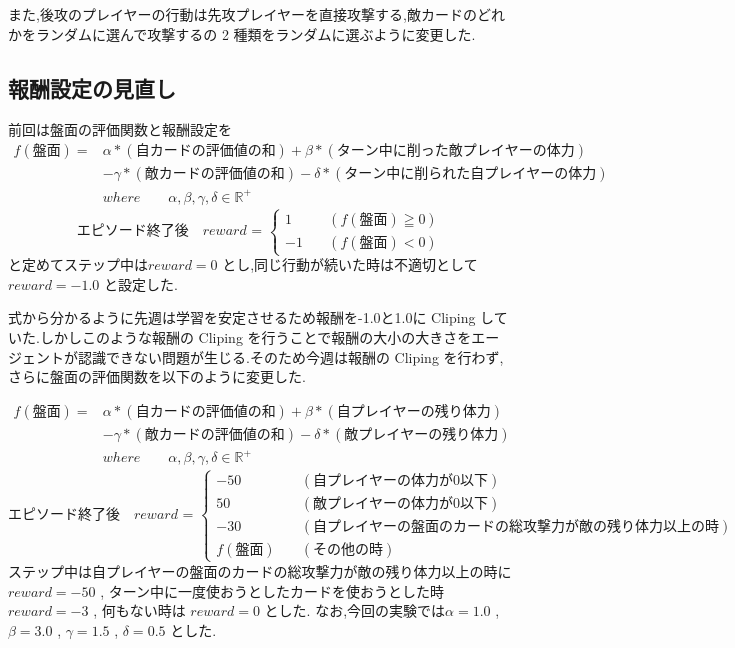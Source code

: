 \documentclass{jarticle}     %
\begin{document}
また,後攻のプレイヤーの行動は先攻プレイヤーを直接攻撃する,敵カードのどれかをランダムに選んで攻撃するの 2 種類をランダムに選ぶように変更した.

\subsection{報酬設定の見直し}
前回は盤面の評価関数と報酬設定を
\begin{equation*}
  \begin{split}
    f(\mathrm{盤面}) = 
    &\alpha*\mathrm{(自カードの評価値の和)}+\beta*\mathrm{(ターン中に削った敵プレイヤーの体力)}\\
   & - \gamma*\mathrm{(敵カードの評価値の和)} - \delta*\mathrm{(ターン中に削られた自プレイヤーの体力)}\\
    &where \qquad \alpha , \beta , \gamma , \delta \in \mathbb{R}^+
  \end{split}
\end{equation*}
\begin{equation*}
  \mathrm{エピソード終了後}
  \quad reward \text{ = }
  \left\{
    \begin{aligned}
        1 \quad &(f(\mathrm{盤面}) \geqq 0) \\
        -1 \quad &(f(\mathrm{盤面}) < 0)
    \end{aligned}
    \right.
\end{equation*}
と定めてステップ中は$reward = 0$ とし,同じ行動が続いた時は不適切として $reward = -1.0$ と設定した.

式から分かるように先週は学習を安定させるため報酬を-1.0と1.0に Cliping していた.しかしこのような報酬の Cliping を行うことで報酬の大小の大きさをエージェントが認識できない問題が生じる.そのため今週は報酬の Cliping を行わず,さらに盤面の評価関数を以下のように変更した.

\begin{equation*}
  \begin{split}
    f(\mathrm{盤面}) = 
    &\alpha*\mathrm{(自カードの評価値の和)}+\beta*\mathrm{(自プレイヤーの残り体力)}\\
   & - \gamma*\mathrm{(敵カードの評価値の和)} - \delta*\mathrm{(敵プレイヤーの残り体力)}\\
    &where \qquad \alpha , \beta , \gamma , \delta \in \mathbb{R}^+
  \end{split}
\end{equation*}
\begin{equation*}
  \mathrm{エピソード終了後}
  \quad reward \text{ = }
  \left\{
    \begin{aligned}
        -50 \quad &(自プレイヤーの体力が0以下) \\
        50 \quad &(敵プレイヤーの体力が0以下) \\
        -30 \quad &(自プレイヤーの盤面のカードの総攻撃力が敵の残り体力以上の時)\\
        f(盤面) \quad &(その他の時)
    \end{aligned}
    \right.
\end{equation*}
ステップ中は自プレイヤーの盤面のカードの総攻撃力が敵の残り体力以上の時に$reward = -50$ , ターン中に一度使おうとしたカードを使おうとした時 $reward = -3$ , 何もない時は $reward = 0$ とした.
なお,今回の実験では$\alpha = 1.0$ , $\beta = 3.0$ , $\gamma = 1.5$ , $\delta = 0.5$ とした.
\end{document}
